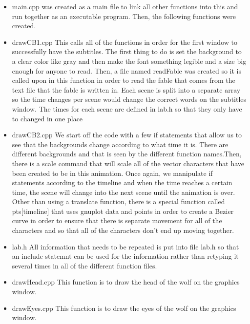 \documentclass{article}
\begin{document}
\begin{itemize}
	\item main.cpp was created as a main file
        to link all other functions into this and run
        together as an executable program. Then, the following
        functions were created.
        
	\item drawCB1.cpp This calls all of the functions in order for the first 
	window to successfully have the subtitles. The first thing
	to do is set the background to a clear color like gray
	and then make the font something legible and a size 
	big enough for anyone to read. Then, a file named 
	readFable was created so it is called upon in this function
	in order to read the fable that comes from the text file
	that the fable is written in. Each scene is split into a separate
	array so the time changes per scene would change the correct
	words on the subtitles window. The times for each scene are 
	defined in lab.h so that they only have to changed in one place
		
	\item drawCB2.cpp We start off the code with a few if statements
	that allow us to see that the backgrounds change
	according to what time it is. There are different
	backgrounds and that is seen by the different
	function names.Then, there is a scale command
	that will scale all of the vector characters that 
	have been created to be in this animation. 
	Once again, we manipulate if statements
	according to the timeline and when the time
	reaches a certain time, the scene will change into
	the next scene until the animation is over. Other 
	than using a translate function, there is a special
	function called pts[timeline] that uses gnuplot 
	data and points in order to create a Bezier curve
	in order to ensure that there is separate movement
	for all of the characters and so that all of the
	characters don't end up moving together.
	
	\item lab.h All information that needs to be repeated is put into file lab.h so 
	that an include statemnt can be used for the information rather than retyping
	 it several times in all of the different function files.
	 
	\item drawHead.cpp  This function is to draw the head of the wolf
         on the graphics window.

	\item drawEyes.cpp This function is to draw the eyes of the wolf
         on the graphics window.
         

\end{itemize}
\end{document}
